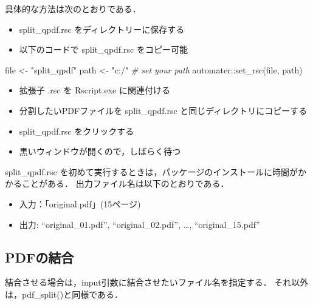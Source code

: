 \documentclass[
]{article}
\newenvironment{Shaded}{\begin{snugshade}}{\end{snugshade}}
\newcommand{\CommentTok}[1]{\textcolor[rgb]{0.56,0.35,0.01}{\textit{#1}}}
\newcommand{\FunctionTok}[1]{\textcolor[rgb]{0.00,0.00,0.00}{#1}}
\newcommand{\NormalTok}[1]{#1}
\newcommand{\OtherTok}[1]{\textcolor[rgb]{0.56,0.35,0.01}{#1}}
\newcommand{\SpecialCharTok}[1]{\textcolor[rgb]{0.00,0.00,0.00}{#1}}
\newcommand{\StringTok}[1]{\textcolor[rgb]{0.31,0.60,0.02}{#1}}
\providecommand{\tightlist}{%
  \setlength{\itemsep}{0pt}\setlength{\parskip}{0pt}}
\begin{document}
具体的な方法は次のとおりである．

\begin{itemize}
\tightlist
\item
  split\_qpdf.rsc をディレクトリーに保存する\\
\item
  以下のコードで split\_qpdf.rsc をコピー可能
\end{itemize}

\begin{Shaded}
\begin{Highlighting}[]
\NormalTok{file }\OtherTok{\textless{}{-}} \StringTok{"split\_qpdf"}
\NormalTok{path }\OtherTok{\textless{}{-}} \StringTok{"c:/"} \CommentTok{\# set your path}
\NormalTok{automater}\SpecialCharTok{::}\FunctionTok{set\_rsc}\NormalTok{(file, path)}
\end{Highlighting}
\end{Shaded}

\begin{itemize}
\tightlist
\item
  拡張子 .rsc を Rscript.exe に関連付ける\\
\item
  分割したいPDFファイルを split\_qpdf.rsc と同じディレクトリにコピーする\\
\item
  split\_qpdf.rsc をクリックする\\
\item
  黒いウィンドウが開くので，しばらく待つ
\end{itemize}

split\_qpdf.rsc を初めて実行するときは，パッケージのインストールに時間がかかることがある．
出力ファイル名は以下のとおりである．

\begin{itemize}
\tightlist
\item
  入力：「original.pdf」(15ページ)\\
\item
  出力: ``original\_01.pdf'', ``original\_02.pdf'', \ldots, ``original\_15.pdf''
\end{itemize}

\hypertarget{pdfux306eux7d50ux5408}{%
\subsection{PDFの結合}\label{pdfux306eux7d50ux5408}}

結合させる場合は，input引数に結合させたいファイル名を指定する．
それ以外は，pdf\_split()と同様である．
\end{document}
